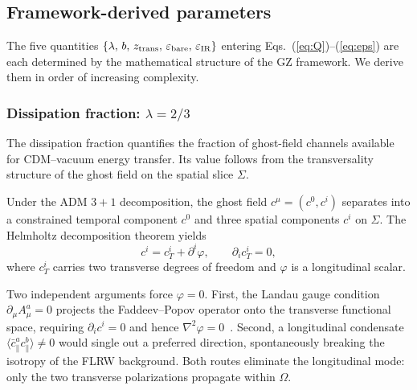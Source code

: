 \documentclass[a4paper,fleqn]{cas-dc}
\newcommand{\epsbare}{\varepsilon_{\rm bare}}
\newcommand{\epsIR}{\varepsilon_{\rm IR}}
\newcommand{\ztrans}{z_{\rm trans}}
\begin{document}
\subsection{Framework-derived parameters}
\label{sec:params}

The five quantities $\{\lambda,\, b,\, \ztrans,\, \epsbare,\, \epsIR\}$
entering Eqs.~(\ref{eq:Q})--(\ref{eq:eps}) are each determined by the
mathematical structure of the GZ framework. We derive them in order of
increasing complexity.

\subsubsection{Dissipation fraction: $\lambda = 2/3$}
\label{sec:lambda}

The dissipation fraction quantifies the fraction of ghost-field
channels available for CDM--vacuum energy transfer. Its value follows
from the transversality structure of the ghost field on the spatial
slice $\Sigma$.

Under the ADM $3{+}1$ decomposition, the ghost field
$c^\mu = (c^0, c^i)$ separates into a constrained temporal component
$c^0$ and three spatial components $c^i$ on $\Sigma$. The Helmholtz
decomposition theorem yields
\begin{equation}
c^i = c^i_T + \partial^i \varphi, \qquad
\partial_i c^i_T = 0,
\label{eq:helmholtz}
\end{equation}
where $c^i_T$ carries two transverse degrees of freedom and $\varphi$
is a longitudinal scalar.

Two independent arguments force $\varphi = 0$. First, the Landau
gauge condition $\partial_\mu A^a_\mu = 0$ projects the
Faddeev--Popov operator onto the transverse functional space,
requiring $\partial_i c^i = 0$ and hence
$\nabla^2\varphi = 0$~\cite{gribov1978}. Second, a longitudinal
condensate
$\langle \bar{c}^a_\parallel c^b_\parallel \rangle \neq 0$ would
single out a preferred direction, spontaneously breaking the isotropy
of the FLRW background. Both routes eliminate the longitudinal mode:
only the two transverse polarizations propagate within $\Omega$.
\end{document}

